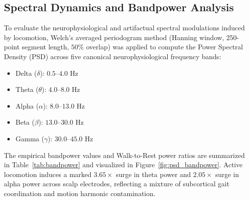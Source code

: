 \documentclass[review,12pt]{elsarticle}
\begin{document}
\subsection{Spectral Dynamics and Bandpower Analysis}
To evaluate the neurophysiological and artifactual spectral modulations induced by locomotion, Welch's averaged periodogram method (Hanning window, 250-point segment length, $50\%$ overlap) was applied to compute the Power Spectral Density (PSD) across five canonical neurophysiological frequency bands:
\begin{itemize}
    \item Delta ($\delta$): $0.5\text{--}4.0\text{ Hz}$
    \item Theta ($\theta$): $4.0\text{--}8.0\text{ Hz}$
    \item Alpha ($\alpha$): $8.0\text{--}13.0\text{ Hz}$
    \item Beta ($\beta$): $13.0\text{--}30.0\text{ Hz}$
    \item Gamma ($\gamma$): $30.0\text{--}45.0\text{ Hz}$
\end{itemize}

The empirical bandpower values and Walk-to-Rest power ratios are summarized in Table~\ref{tab:bandpower} and visualized in Figure~\ref{fig:psd_bandpower}. Active locomotion induces a marked $3.65\times$ surge in theta power and $2.05\times$ surge in alpha power across scalp electrodes, reflecting a mixture of subcortical gait coordination and motion harmonic contamination.

\begin{table}[htbp]
\centering
\caption{Power Spectral Density (PSD) Bandpower Modulations Between Rest and Walk}
\label{tab:bandpower}
\vspace{0.4em}
\end{table}
\end{document}

